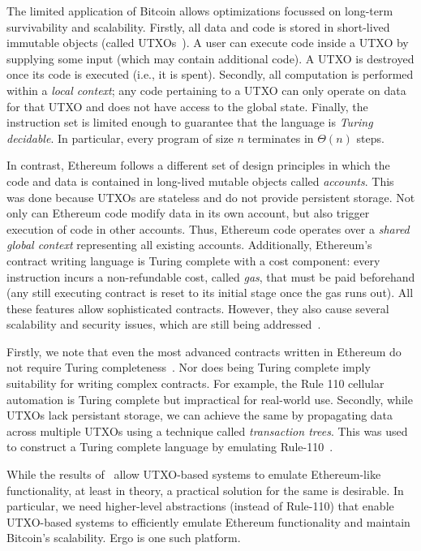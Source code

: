 \documentclass[runningheads]{llncs}
\begin{document}
The limited application of Bitcoin allows optimizations focussed on long-term survivability and scalability. Firstly, all data and code is stored in short-lived immutable objects (called UTXOs~\cite{utxo}). A user can execute code inside a UTXO by supplying some input (which may contain additional code). A UTXO is destroyed once its code is executed (i.e., it is spent). Secondly, all computation is performed within a {\em local context}; any code pertaining to a UTXO can only operate on data for that UTXO and does not have access to the global state. Finally, the instruction set is limited enough to guarantee that the language is {\em Turing decidable}. In particular, every program of size $n$ terminates in $\Theta(n)$ steps. 

In contrast, Ethereum follows a different set of design principles in which the code and data is contained in long-lived mutable objects called {\em accounts}. This was done because UTXOs are stateless and do not provide persistent storage. 
Not only can Ethereum code modify data in its own account, but also trigger execution of code in other accounts. Thus, Ethereum code operates over a {\em shared global context} representing all existing accounts. 
Additionally, Ethereum's contract writing language is Turing complete with a cost component: every instruction incurs a non-refundable cost, called {\em gas}, that must be paid beforehand (any still executing contract is reset to its initial stage once the gas runs out). 
All these features allow sophisticated contracts. However, they also cause several scalability and security issues, which are still being addressed~\cite{Luu:2016:MSC:2976749.2978309,hackernoon17}. 


Firstly, we note that even the most advanced contracts written in Ethereum do not require Turing completeness~\cite{hackernoon16,hackernoon17}. Nor does being Turing complete imply suitability for writing complex contracts. For example, the Rule 110 \cite{Cook_2009,neary2006p} 
cellular automation is Turing complete but impractical for real-world use. 
Secondly, while UTXOs lack persistant storage, we can achieve the same by propagating data across multiple UTXOs using a technique called {\em transaction trees}. 
This was used to construct a Turing complete language by emulating Rule-110~\cite{CKM18a}.

While the results of~\cite{CKM18a} allow UTXO-based systems to emulate Ethereum-like functionality, at least in theory, a practical solution for the same is desirable. In particular, we need higher-level abstractions (instead of Rule-110) that enable UTXO-based systems to efficiently emulate Ethereum functionality and maintain Bitcoin's scalability. Ergo is one such platform.
\end{document}
